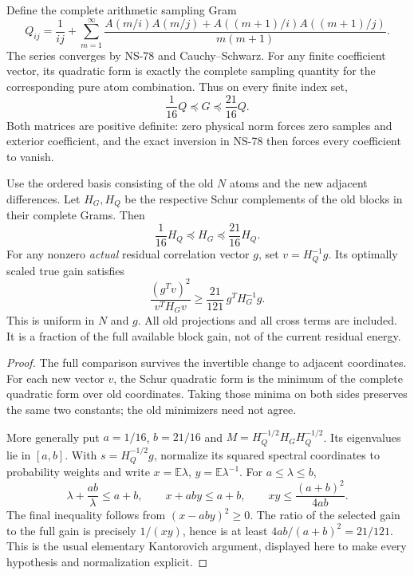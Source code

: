 Define the complete arithmetic sampling Gram
\begin{equation}
 Q_{ij}=\frac1{ij}+\sum_{m=1}^\infty\frac{
 A(m/i)A(m/j)+A((m+1)/i)A((m+1)/j)}{m(m+1)}.
 \label{eq:ns80-sampling-gram}
\end{equation}
The series converges by NS-78 and Cauchy--Schwarz. For any finite
coefficient vector, its quadratic form is exactly the complete
sampling quantity for the corresponding pure atom combination.
Thus on every finite index set,
\begin{equation}
 \frac1{16}Q\preceq G\preceq\frac{21}{16}Q.
 \label{eq:ns80-full-comparison}
\end{equation}
Both matrices are positive definite: zero physical norm forces zero
samples and exterior coefficient, and the exact inversion in NS-78
then forces every coefficient to vanish.

\begin{proposition}
\label{prop:ns80-uniform-efficiency}
Use the ordered basis consisting of the old $N$ atoms and the new
adjacent differences. Let $H_G,H_Q$ be the respective Schur complements
of the old blocks in their complete Grams. Then
\[
 \frac1{16}H_Q\preceq H_G\preceq\frac{21}{16}H_Q.
\]
For any nonzero \emph{actual} residual correlation vector $g$, set
$v=H_Q^{-1}g$. Its optimally scaled true gain satisfies
\begin{equation}
 \frac{(g^Tv)^2}{v^TH_Gv}
 \geq\frac{21}{121}\,g^TH_G^{-1}g.
 \label{eq:ns80-gain-fraction}
\end{equation}
This is uniform in $N$ and $g$. All old projections and all cross terms
are included. It is a fraction of the full available block gain, not
of the current residual energy.
\end{proposition}
\begin{proof}
The full comparison survives the invertible change to adjacent
coordinates. For each new vector $v$, the Schur quadratic form is the
minimum of the complete quadratic form over old coordinates. Taking
those minima on both sides preserves the same two constants; the old
minimizers need not agree.

More generally put $a=1/16$, $b=21/16$ and
$M=H_Q^{-1/2}H_GH_Q^{-1/2}$. Its eigenvalues lie in $[a,b]$.
With $s=H_Q^{-1/2}g$, normalize its squared spectral coordinates to
probability weights and write $x=\mathbb E\lambda$,
$y=\mathbb E\lambda^{-1}$. For $a\leq\lambda\leq b$,
\[
 \lambda+\frac{ab}{\lambda}\leq a+b,
 \qquad x+aby\leq a+b,
 \qquad xy\leq\frac{(a+b)^2}{4ab}.
\]
The final inequality follows from $(x-aby)^2\geq0$.
The ratio of the selected gain to the full gain is precisely
$1/(xy)$, hence is at least $4ab/(a+b)^2=21/121$.
This is the usual elementary Kantorovich argument, displayed here
to make every hypothesis and normalization explicit.
\end{proof}

